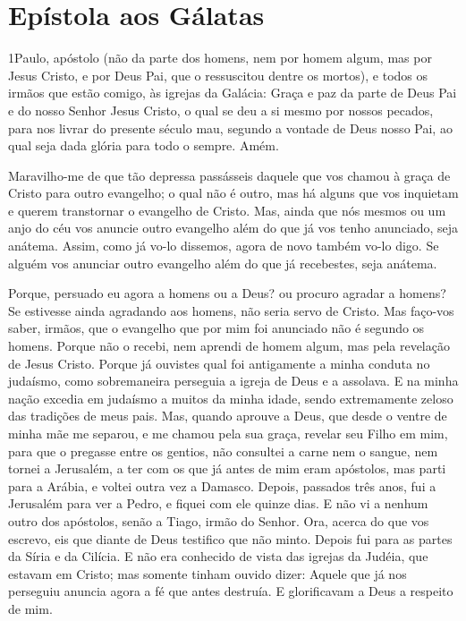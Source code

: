 \thispagestyle{empty}
\chapter*{Epístola aos Gálatas}

\lettrine{1} Paulo, apóstolo (não da parte dos homens, nem por
homem algum, mas por Jesus Cristo, e por Deus Pai, que o ressuscitou
dentre os mortos), e todos os irmãos que estão comigo, às
igrejas da Galácia: Graça e paz da parte de Deus Pai e do nosso
Senhor Jesus Cristo, o qual se deu a si mesmo por nossos
pecados, para nos livrar do presente século mau, segundo a vontade
de Deus nosso Pai, ao qual seja dada glória para todo o sempre.
Amém.

Maravilho-me de que tão depressa passásseis daquele que vos chamou
à graça de Cristo para outro evangelho; o qual não é outro, mas
há alguns que vos inquietam e querem transtornar o evangelho de
Cristo. Mas, ainda que nós mesmos ou um anjo do céu vos anuncie
outro evangelho além do que já vos tenho anunciado, seja anátema.
Assim, como já vo-lo dissemos, agora de novo também vo-lo digo.
Se alguém vos anunciar outro evangelho além do que já recebestes,
seja anátema.

Porque, persuado eu agora a homens ou a Deus? ou procuro agradar
a homens? Se estivesse ainda agradando aos homens, não seria servo
de Cristo. Mas faço-vos saber, irmãos, que o evangelho que
por mim foi anunciado não é segundo os homens. Porque não o
recebi, nem aprendi de homem algum, mas pela revelação de Jesus
Cristo. Porque já ouvistes qual foi antigamente a minha
conduta no judaísmo, como sobremaneira perseguia a igreja de Deus e
a assolava. E na minha nação excedia em judaísmo a muitos da
minha idade, sendo extremamente zeloso das tradições de meus pais.
Mas, quando aprouve a Deus, que desde o ventre de minha mãe
me separou, e me chamou pela sua graça, revelar seu Filho em
mim, para que o pregasse entre os gentios, não consultei a carne nem
o sangue, nem tornei a Jerusalém, a ter com os que já antes
de mim eram apóstolos, mas parti para a Arábia, e voltei outra vez a
Damasco. Depois, passados três anos, fui a Jerusalém para ver
a Pedro, e fiquei com ele quinze dias. E não vi a nenhum
outro dos apóstolos, senão a Tiago, irmão do Senhor. Ora,
acerca do que vos escrevo, eis que diante de Deus testifico que não
minto. Depois fui para as partes da Síria e da Cilícia.
E não era conhecido de vista das igrejas da Judéia, que
estavam em Cristo; mas somente tinham ouvido dizer: Aquele
que já nos perseguiu anuncia agora a fé que antes destruía. E
glorificavam a Deus a respeito de mim.

